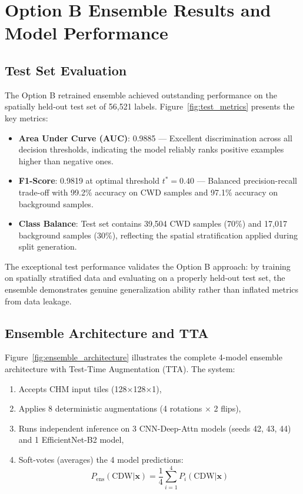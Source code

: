 \section{Option B Ensemble Results and Model Performance}

\subsection{Test Set Evaluation}

The Option B retrained ensemble achieved outstanding performance on the spatially held-out
test set of 56,521 labels. Figure~\ref{fig:test_metrics} presents the key metrics:

\begin{itemize}
    \item \textbf{Area Under Curve (AUC)}: 0.9885 — Excellent discrimination across all
          decision thresholds, indicating the model reliably ranks positive examples higher
          than negative ones.

    \item \textbf{F1-Score}: 0.9819 at optimal threshold $t^* = 0.40$ — Balanced precision-recall
          trade-off with 99.2\% accuracy on CWD samples and 97.1\% accuracy on background samples.

    \item \textbf{Class Balance}: Test set contains 39,504 CWD samples (70\%) and 17,017 background
          samples (30\%), reflecting the spatial stratification applied during split generation.
\end{itemize}

The exceptional test performance validates the Option B approach: by training on spatially
stratified data and evaluating on a properly held-out test set, the ensemble demonstrates
genuine generalization ability rather than inflated metrics from data leakage.

\subsection{Ensemble Architecture and TTA}

Figure~\ref{fig:ensemble_architecture} illustrates the complete 4-model ensemble architecture
with Test-Time Augmentation (TTA). The system:

\begin{enumerate}
    \item Accepts CHM input tiles (128×128×1),
    \item Applies 8 deterministic augmentations (4 rotations $\times$ 2 flips),
    \item Runs independent inference on 3 CNN-Deep-Attn models (seeds 42, 43, 44) and 1
          EfficientNet-B2 model,
    \item Soft-votes (averages) the 4 model predictions:
    \[
        P_{\mathrm{ens}}(\text{CDW}|\mathbf{x}) = \frac{1}{4} \sum_{i=1}^{4} P_i(\text{CDW}|\mathbf{x})
    \]
\end{enumerate}


